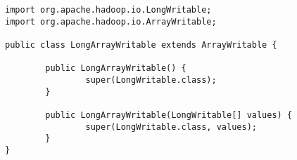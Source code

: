 \begin{lstlisting}[float]
import org.apache.hadoop.io.LongWritable;
import org.apache.hadoop.io.ArrayWritable;

public class LongArrayWritable extends ArrayWritable {

        public LongArrayWritable() {
                super(LongWritable.class);
        }

        public LongArrayWritable(LongWritable[] values) {
                super(LongWritable.class, values);
        }
}
\end{lstlisting}